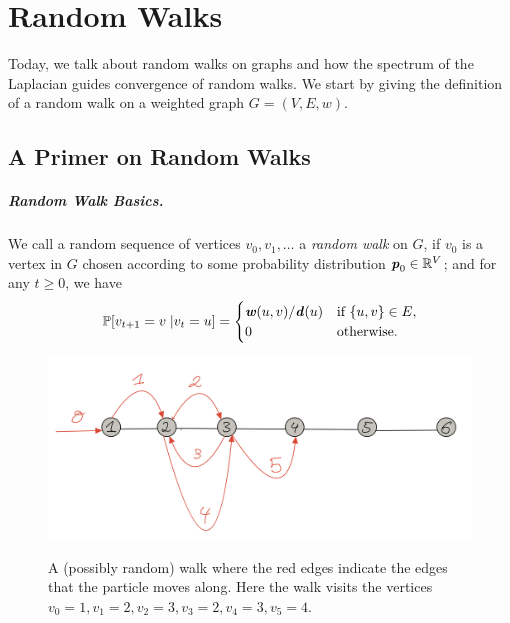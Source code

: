 \newcommand\WWtil{{\tilde{\mathbf{W}}}}
\newcommand\hh{{\boldsymbol{\mathit{h}}}}

\chapter{Random Walks}

\sloppy

Today, we talk about random walks on graphs and how the spectrum of the Laplacian guides convergence of random walks. We start by giving the definition of a random walk on a weighted graph $G=(V,E,w)$.

\section{A Primer on Random Walks}

\paragraph{Random Walk Basics.} We call a random sequence of vertices $v_0, v_1, \dots$ a \emph{random walk} on $G$, if $v_0$ is a vertex in $G$ chosen according to some probability distribution $\boldsymbol{\mathit{p}}_0 \in \mathbb{R}^V$; and for any $t \geq 0$, we have 
\[
\mathbb{P}[v_{t+1} = v \; | v_t = u] = \begin{cases}
    \boldsymbol{\mathit{w}}(u,v)/\boldsymbol{\mathit{d}}(u) & \text{if } \{u,v\} \in E,\\
    0 & \text{otherwise}.
\end{cases}
\]

\begin{figure}[!ht]
    \centering\label{fig:randomWalkSimple}
    \includegraphics[scale=0.4]{fig/lec_RandomWalks_fig1.png}
    \caption{A (possibly random) walk where the red edges indicate the edges that the particle moves along. Here the walk visits the vertices $v_0 = 1, v_1 = 2, v_2 = 3, v_3 = 2, v_4 = 3, v_5 = 4$.}
    \label{fig:my_label}
\end{figure}

